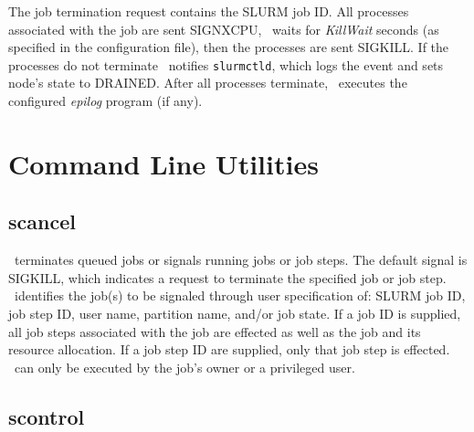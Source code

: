The job termination request contains the SLURM job ID.  
All processes associated with the job are sent SIGNXCPU, \slurmd\
waits for {\em KillWait} seconds (as specified in the configuration 
file), then the processes are sent SIGKILL.
If the processes do not terminate \slurmd\ notifies {\tt slurmctld}, 
which logs the event and sets node's state to DRAINED.
After all processes terminate, \slurmd\ executes the configured 
{\em epilog} program (if any).

\section{Command Line Utilities}

\subsection{scancel}

\scancel\ terminates queued jobs or signals running jobs or job steps. 
The default signal is SIGKILL, which indicates a request to terminate 
the specified job or job step. 
\scancel\ identifies the job(s) to be signaled
through user specification of: SLURM job ID, job step ID, user name, 
partition name, and/or job state. 
If a job ID is supplied, all job steps associated with the job are
effected as well as the job and its resource allocation. 
If a job step ID are supplied, only that job step is effected.
\scancel\ can only be executed by the job's owner or a privileged user.

\subsection{scontrol}

